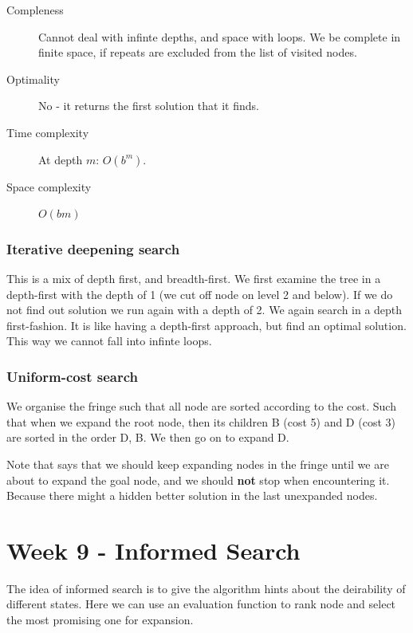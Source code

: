 \documentclass{article}
\begin{document}
\begin{description}
  \item[Compleness] Cannot deal with infinte depths, and space with loops. We be
    complete in finite space, if repeats are excluded from the list of visited
    nodes.
  \item[Optimality] No - it returns the first solution that it finds.
  \item[Time complexity] At depth $m$: $O(b^m)$.
  \item[Space complexity] $O(bm)$
\end{description}

\subsubsection{Iterative deepening search}%
\label{par:iterative_deepening_search}
This is a mix of depth first, and breadth-first. We first examine the tree in a
depth-first with the depth of 1 (we cut off node on level 2 and below). If we do
not find out solution we run again with a depth of 2. We again search in a depth
first-fashion. It is like having a depth-first approach, but find an optimal
solution. This way we cannot fall into infinte loops.


\subsubsection{Uniform-cost search}%
\label{par:uniform_cost_search}
We organise the fringe such that all node are sorted according to the cost. Such
that when we expand the root node, then its children B (cost 5) and D (cost 3)
are sorted in the order D, B. We then go on to expand D.

Note that \cite[p. 33]{presentation:solving_problems_by_searching} says that we
should keep expanding nodes in the fringe until we are about to expand the goal
node, and we should \textbf{not} stop when encountering it. Because there might
a hidden better solution in the last unexpanded nodes.



\newpage



\section{Week 9 - Informed Search}%
\label{sec:1_march_informed_search}
The idea of informed search is to give the algorithm hints about the deirability
of different states. Here we can use an evaluation function to rank node and
select the most promising one for expansion.
\end{document}

